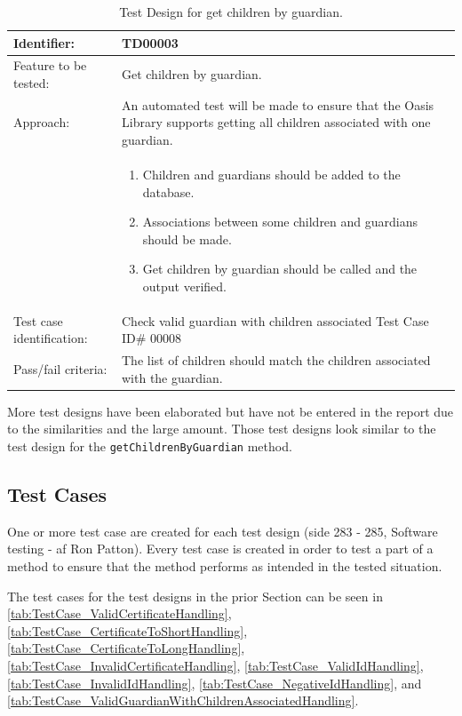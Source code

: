 \begin{table}[htbp]
	\centering
		\begin{tabular}{| p{4.5cm} | m{9cm} |}
			\hline
			Identifier: 				& TD00003 \\ \hline
			Feature to be tested:		& Get children by guardian. \\ \hline
			Approach:					& An automated test will be made to ensure that the Oasis Library supports getting all children associated with one guardian. \\
										&	\begin{enumerate}
												\item Children and guardians should be added to the database.
												\item Associations between some children and guardians should be made.
												\item Get children by guardian should be called and the output verified.
											\end{enumerate} \\ \hline
			Test case identification: 	& Check valid guardian with children associated Test Case ID\# 00008 \\ \hline
			Pass/fail criteria:			& The list of children should match the children associated with the guardian. \\ \hline
		\end{tabular}
	\caption{Test Design for get children by guardian.}
	\label{tab:TestDesign_GetChildrenByGuardian}
\end{table}

More test designs have been elaborated but have not be entered in the report due to the similarities and the large amount.
Those test designs look similar to the test design for the \texttt{getChildrenByGuardian} method.

\subsection{Test Cases}
One or more test case are created for each test design (side 283 - 285, Software testing - af Ron Patton).
Every test case is created in order to test a part of a method to ensure that the method performs as intended in the tested situation.

The test cases for the test designs in the prior Section can be seen in 
\autoref{tab:TestCase_ValidCertificateHandling}, 
\autoref{tab:TestCase_CertificateToShortHandling},
\autoref{tab:TestCase_CertificateToLongHandling},
\autoref{tab:TestCase_InvalidCertificateHandling},
\autoref{tab:TestCase_ValidIdHandling},
\autoref{tab:TestCase_InvalidIdHandling},
\autoref{tab:TestCase_NegativeIdHandling}, 
and \autoref{tab:TestCase_ValidGuardianWithChildrenAssociatedHandling}.

